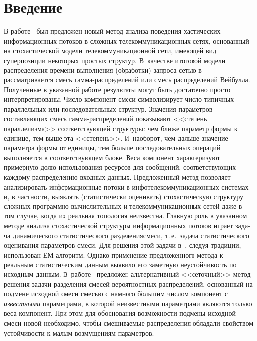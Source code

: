       \begin{multicols}{2}
      
            \label{st\stat}

\section{Введение}

В работе~\cite{BKSh} был предложен новый метод анализа поведения
хаотических информационных потоков в сложных телекоммуникационных
сетях, основанный на стохастической модели телекоммуникационной
сети, имеющей вид суперпозиции некоторых простых структур.  
В~качестве итоговой модели распределения времени выполнения
(обработки) запроса сетью в~\cite{BKSh} рассматривается смесь
гам\-ма-рас\-пре\-де\-ле\-ний или смесь распределений Вейбулла. Полученные в
указанной работе результаты могут быть достаточно просто
интерпретированы. Число компонент смеси символизирует число
типичных параллельных или последовательных структур. Значения
параметров составляющих смесь гам\-ма-рас\-пре\-де\-ле\-ний показывают
<<степень параллелизма>> соответствующей структуры: чем ближе
параметр формы к единице, тем выше эта <<степень>>. И~наоборот,
чем дальше значение параметра формы от единицы, тем больше
последовательных операций выполняется в соответствующем блоке.
Веса компонент характеризуют примерную долю использования ресурсов
для сообщений, соответствующих каждому распределению входных
данных. Предложенный метод позволяет анализировать информационные
потоки в инфотелекоммуникационных системах и, в част\-ности,
выявлять (статистически оценивать) стохастическую структуру
сложных прог\-рам\-мно-вы\-чис\-ли\-тель\-ных и телекоммуникационных сетей
даже в том случае, когда их реальная топология неизвестна. Главную
роль в указанном методе анализа стохастической структуры
информационных потоков играет зада-\linebreak ча динамического статистического
разделения\linebreak смеси, т.\,е.\ задача статистического оценивания
па\-ра\-мет\-ров смеси. Для решения этой задачи в~\cite{BKSh}, следуя
традиции, использован ЕМ-ал\-го\-ритм. Однако примене\-ние предложенного
метода к реальным статистическим данным выявило его заметную
неустойчивость по исходным данным. В~работе~\cite{KN} предложен
альтернативный <<сеточный>> метод решения задачи разделения смесей
вероятностных распределений, основанный на подмене исходной смеси
смесью с намного б$\acute{\mbox{о}}$льшим числом компонент с {\it известными}
параметрами, в которой неизвестными параметрами являются только
веса компонент. При этом для обоснования возможности подмены
исходной смеси новой необходимо, чтобы смешиваемые распределения
обладали свойством устойчивости к малым возмущениям параметров.


\end{multicols}
